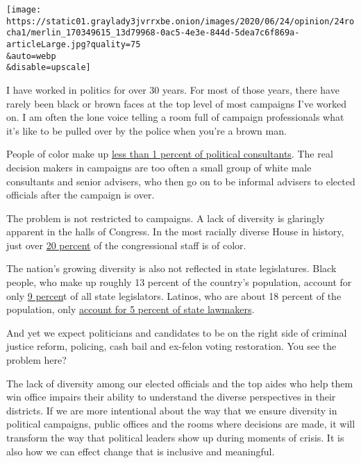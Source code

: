 \texttt{[image: https://static01.graylady3jvrrxbe.onion/images/2020/06/24/opinion/24rocha1/merlin\_170349615\_13d79968-0ac5-4e3e-844d-5dea7c6f869a-articleLarge.jpg?quality=75\\\&auto=webp\\\&disable=upscale]}

I have worked in politics for over 30 years. For most of those years,
there have rarely been black or brown faces at the top level of most
campaigns I've worked on. I am often the lone voice telling a room full
of campaign professionals what it's like to be pulled over by the police
when you're a brown man.

People of color make up
\href{https://suppliertynews.com/2017/07/27/the-national-association-of-diverse-consultants-looks-to-increase-diversity-in-political-consulting/}{less
than 1 percent of political consultants}. The real decision makers in
campaigns are too often a small group of white male consultants and
senior advisers, who then go on to be informal advisers to elected
officials after the campaign is over.

The problem is not restricted to campaigns. A lack of diversity is
glaringly apparent in the halls of Congress. In the most racially
diverse House in history, just over
\href{https://www.nytimes3xbfgragh.onion/2019/03/15/us/house-staff-minorities-democrats.html}{20
percent} of the congressional staff is of color.

The nation's growing diversity is also not reflected in state
legislatures. Black people, who make up roughly 13 percent of the
country's population, account for only
\href{https://www.ncsl.org/research/about-state-legislatures/who-we-elect.aspx}{9
percen}t of all state legislators. Latinos, who are about 18 percent of
the population, only
\href{https://www.ncsl.org/research/about-state-legislatures/who-we-elect.aspx}{account
for 5 percent of state lawmakers}.

And yet we expect politicians and candidates to be on the right side of
criminal justice reform, policing, cash bail and ex-felon voting
restoration. You see the problem here?

The lack of diversity among our elected officials and the top aides who
help them win office impairs their ability to understand the diverse
perspectives in their districts. If we are more intentional about the
way that we ensure diversity in political campaigns, public offices and
the rooms where decisions are made, it will transform the way that
political leaders show up during moments of crisis. It is also how we
can effect change that is inclusive and meaningful.


